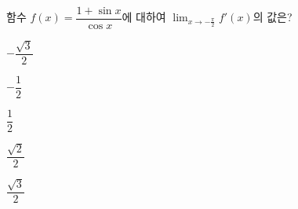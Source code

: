 함수 $f(x)=\dfrac{1+\sin x}{\cos x}$에 대하여 $\displaystyle\lim_{x\to -\frac{\pi}{2}}f'(x)$의 값은?
\begin{choices32}{\rule[-3ex]{0pt}{8ex}$-\dfrac{\sqrt{3}}{2}$}{\rule[-3ex]{0pt}{8ex}$-\dfrac{1}{2}$}{\rule[-3ex]{0pt}{8ex}$\dfrac{1}{2}$}{\rule[-3ex]{0pt}{8ex}$\dfrac{\sqrt{2}}{2}$}{\rule[-3ex]{0pt}{8ex}$\dfrac{\sqrt{3}}{2}$}\end{choices32}
